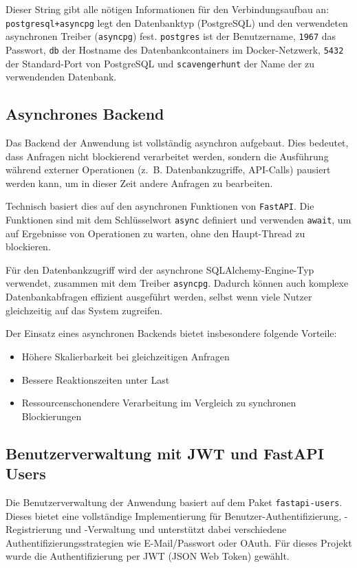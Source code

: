 \documentclass[oneside]{ausarbeitung}
\begin{document}
Dieser String gibt alle nötigen Informationen für den Verbindungsaufbau an:  
\texttt{postgresql+asyncpg} legt den Datenbanktyp (PostgreSQL) und den verwendeten asynchronen Treiber (\texttt{asyncpg}) fest.  
\texttt{postgres} ist der Benutzername, \texttt{1967} das Passwort, \texttt{db} der Hostname des Datenbankcontainers im Docker-Netzwerk, \texttt{5432} der Standard-Port von PostgreSQL und \texttt{scavengerhunt} der Name der zu verwendenden Datenbank.  


\subsection{Asynchrones Backend}

Das Backend der Anwendung ist vollständig asynchron aufgebaut.  
Dies bedeutet, dass Anfragen nicht blockierend verarbeitet werden, sondern die Ausführung während externer Operationen (z.~B. Datenbankzugriffe, API-Calls) pausiert werden kann, um in dieser Zeit andere Anfragen zu bearbeiten.  

Technisch basiert dies auf den asynchronen Funktionen von \texttt{FastAPI}.
Die Funktionen sind mit dem Schlüsselwort \texttt{async} definiert und verwenden \texttt{await}, um auf Ergebnisse von Operationen zu warten, ohne den Haupt-Thread zu blockieren.  

Für den Datenbankzugriff wird der asynchrone SQLAlchemy-Engine-Typ verwendet, zusammen mit dem Treiber \texttt{asyncpg}.  
Dadurch können auch komplexe Datenbankabfragen effizient ausgeführt werden, selbst wenn viele Nutzer gleichzeitig auf das System zugreifen.

Der Einsatz eines asynchronen Backends bietet insbesondere folgende Vorteile:
\begin{itemize}
    \item Höhere Skalierbarkeit bei gleichzeitigen Anfragen
    \item Bessere Reaktionszeiten unter Last
    \item Ressourcenschonendere Verarbeitung im Vergleich zu synchronen Blockierungen
\end{itemize}

\subsection{Benutzerverwaltung mit JWT und FastAPI Users}

Die Benutzerverwaltung der Anwendung basiert auf dem Paket \texttt{fastapi-users}.  
Dieses bietet eine vollständige Implementierung für Benutzer-Authentifizierung, -Registrierung und -Verwaltung und unterstützt dabei verschiedene Authentifizierungsstrategien wie E-Mail/Passwort oder OAuth\autocite{fastapi-users:Official}.
Für dieses Projekt wurde die Authentifizierung per JWT (JSON Web Token) gewählt.
\end{document}
